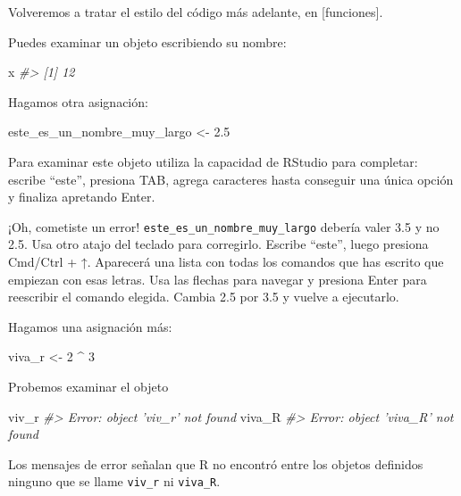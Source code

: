 \documentclass[11pt,oneside]{report}
\newenvironment{Shaded}{\begin{snugshade}}{\end{snugshade}}
\newcommand{\CommentTok}[1]{\textcolor[rgb]{0.56,0.35,0.01}{\textit{#1}}}
\newcommand{\DecValTok}[1]{\textcolor[rgb]{0.00,0.00,0.81}{#1}}
\newcommand{\FloatTok}[1]{\textcolor[rgb]{0.00,0.00,0.81}{#1}}
\newcommand{\NormalTok}[1]{#1}
\newcommand{\OperatorTok}[1]{\textcolor[rgb]{0.81,0.36,0.00}{\textbf{#1}}}
\newcommand{\StringTok}[1]{\textcolor[rgb]{0.31,0.60,0.02}{#1}}
\begin{document}
Volveremos a tratar el estilo del código más adelante, en
{[}funciones{]}.

Puedes examinar un objeto escribiendo su nombre:

\begin{Shaded}
\begin{Highlighting}[]
\NormalTok{x}
\CommentTok{#> [1] 12}
\end{Highlighting}
\end{Shaded}

Hagamos otra asignación:

\begin{Shaded}
\begin{Highlighting}[]
\NormalTok{este_es_un_nombre_muy_largo <-}\StringTok{ }\FloatTok{2.5}
\end{Highlighting}
\end{Shaded}

Para examinar este objeto utiliza la capacidad de RStudio para
completar: escribe ``este'', presiona TAB, agrega caracteres hasta
conseguir una única opción y finaliza apretando Enter.

¡Oh, cometiste un error! \texttt{este\_es\_un\_nombre\_muy\_largo}
debería valer 3.5 y no 2.5. Usa otro atajo del teclado para corregirlo.
Escribe ``este'', luego presiona Cmd/Ctrl + ↑. Aparecerá una lista con
todas los comandos que has escrito que empiezan con esas letras. Usa las
flechas para navegar y presiona Enter para reescribir el comando
elegida. Cambia 2.5 por 3.5 y vuelve a ejecutarlo.

Hagamos una asignación más:

\begin{Shaded}
\begin{Highlighting}[]
\NormalTok{viva_r <-}\StringTok{ }\DecValTok{2} \OperatorTok{^}\StringTok{ }\DecValTok{3}
\end{Highlighting}
\end{Shaded}

Probemos examinar el objeto

\begin{Shaded}
\begin{Highlighting}[]
\NormalTok{viv_r}
\CommentTok{#> Error: object 'viv_r' not found}
\NormalTok{viva_R}
\CommentTok{#> Error: object 'viva_R' not found}
\end{Highlighting}
\end{Shaded}

Los mensajes de error señalan que R no encontró entre los objetos
definidos ninguno que se llame \texttt{viv\_r} ni \texttt{viva\_R}.
\end{document}
